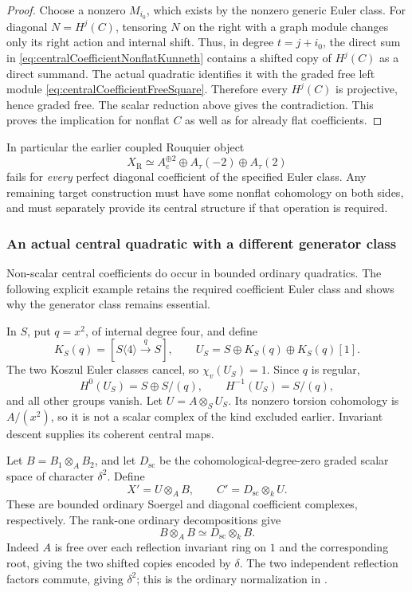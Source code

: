 \documentclass[11pt,a4paper]{article}
\renewcommand{\S}{\ensuremath{\mathsection}}
\theoremstyle{named}\newtheorem{finding}{Finding}[section]
\theoremstyle{definition}\newtheorem{definition}[finding]{Definition}
\theoremstyle{remark}\newtheorem{remark}[finding]{Remark}
\begin{document}
\begin{proof}
Choose a nonzero \(M_{i_0}\), which exists by
the nonzero generic Euler class. For diagonal
\(N=H^j(C)\), tensoring \(N\) on the right
with a graph module changes only its right
action and internal shift. Thus, in degree
\(t=j+i_0\), the direct sum in
\eqref{eq:centralCoefficientNonflatKunneth}
contains a shifted copy of \(H^j(C)\) as a
direct summand.
The actual quadratic identifies it with the
graded free left module
\eqref{eq:centralCoefficientFreeSquare}.
Therefore every \(H^j(C)\) is projective,
hence graded free. The scalar reduction above
gives the contradiction.
This proves the implication for nonflat \(C\)
as well as for already flat coefficients.
\end{proof}

In particular the earlier coupled Rouquier object
\[
 X_{\mathrm R}\simeq A_e^{\oplus2}
              \oplus A_\tau(-2)\oplus A_\tau(2)
\]
fails for \emph{every} perfect diagonal coefficient
of the specified Euler class.
Any remaining target construction must have some
nonflat cohomology on both sides, and must separately
provide its central structure if that operation is
required.

\subsubsection{An actual central quadratic with a different generator class}

Non-scalar central coefficients do occur in bounded
ordinary quadratics. The following explicit example
retains the required coefficient Euler class and
shows why the generator class remains essential.

In \(S\), put \(q=x^2\), of internal degree four,
and define
\[
 K_S(q)=[S\langle4\rangle\xrightarrow{q}S],\qquad
 U_S=S\oplus K_S(q)\oplus K_S(q)[1].
\]
The two Koszul Euler classes cancel, so
\(\chi_v(U_S)=1\). Since \(q\) is regular,
\[
 H^0(U_S)=S\oplus S/(q),\qquad
 H^{-1}(U_S)=S/(q),
\]
and all other groups vanish.
Let \(U=A\otimes_S U_S\). Its nonzero torsion
cohomology is \(A/(x^2)\), so it is not a scalar
complex of the kind excluded earlier.
Invariant descent supplies its coherent central maps.

Let \(B=B_1\otimes_A B_2\), and let
\(D_{\mathrm{sc}}\) be the cohomological-degree-zero
graded scalar space of character \(\delta^2\).
Define
\begin{equation}\label{eq:centralCoefficientDifferentClass}
 X'=U\otimes_A B,\qquad C'=D_{\mathrm{sc}}\otimes_k U.
\end{equation}
These are bounded ordinary Soergel and diagonal
coefficient complexes, respectively.
The rank-one ordinary decompositions give
\[
 B\otimes_A B\simeq D_{\mathrm{sc}}\otimes_k B.
\]
Indeed \(A\) is free over each reflection invariant
ring on \(1\) and the corresponding root, giving
the two shifted copies encoded by \(\delta\).
The two independent reflection factors commute,
giving \(\delta^2\); this is the ordinary
normalization in \cite[\S\S3.3--3.4, pp.~1105--1107]{EW}.
\end{document}
